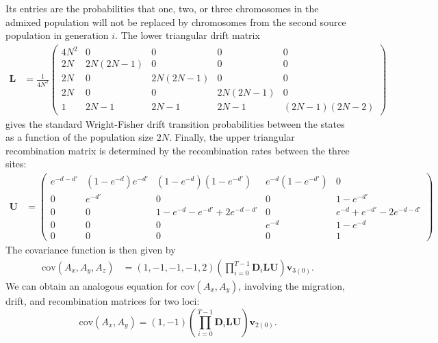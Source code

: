 Its entries are the probabilities that one, two, or three chromosomes in the admixed population will not be replaced by chromosomes from the second source population in generation $i$. The lower triangular drift matrix
\begin{align*}
	\mathbf{L}&=\frac{1}{4N^2}\left( \begin{array}{ccccc}
					 4N^2 		& 0 	& 0 & 0 & 0\\
					 2N 	& 2N(2N-1) & 0 & 0 & 0\\
					 2N 	& 0 & 2N(2N-1) & 0 & 0\\
					 2N 	& 0 & 0 & 2N(2N-1) & 0\\
					 1 & 2N-1 & 2N-1 & 2N-1 & (2N-1)(2N-2)
				\end{array} \right)
\end{align*}
gives the standard Wright-Fisher drift transition probabilities between the states as a function of the population size $2N$. Finally, the upper triangular recombination matrix is determined by the recombination rates between the three sites:
\begin{align*}
	\mathbf{U} &=
		\left( \begin{array}{ccccc}
		e^{-d-d'} & (1-e^{-d})e^{-d'} & (1-e^{-d})(1-e^{-d'}) & e^{-d}(1-e^{-d'}) & 0 \\
		0 & e^{-d'} & 0 & 0 & 1-e^{-d'} \\
		0 & 0 & 1-e^{-d}-e^{-d'}+2e^{-d-d'} & 0 & e^{-d}+e^{-d'}-2e^{-d-d'} \\
		0 & 0 & 0 & e^{-d} & 1-e^{-d} \\
		0 & 0 & 0 & 0 & 1 \end{array} \right)
\end{align*}
The covariance function is then given by
\begin{align}
	\text{cov}(A_x,A_y,A_z) &= \left(1,-1,-1,-1,2\right)\left(\prod_{i=0}^{T-1} \textbf{D}_i \mathbf{L}\mathbf{U}\right)\textbf{v}_{3(0)}.
	\label{cov}
\end{align}
We can obtain an analogous equation for $\text{cov}(A_x,A_y)$, involving the migration, drift, and recombination matrices for two loci:
$$
	\text{cov}(A_x,A_y) = \left(1,-1\right)\left(\prod_{i=0}^{T-1} \textbf{D}_i \mathbf{L}\mathbf{U}\right)\textbf{v}_{2(0)}.
$$

